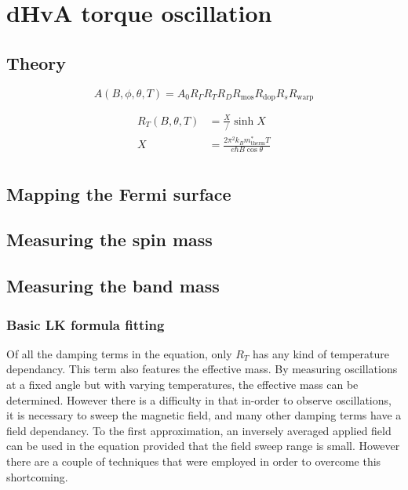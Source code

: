 
\section{dHvA torque oscillation}

\subsection{Theory}

\begin{equation}
A(B,\phi,\theta,T)=A_0R_{\Gamma}R_TR_DR_{\textrm{mos}}R_{\textrm{dop}}R_sR_{\textrm{warp}}
\label{Eqn:2:OscilllationAmp}
\end{equation}

\begin{align}
R_T(B, \theta, T) &= \frac{X}/{\sinh{X}} \\
X                 &= \frac{2\pi^2k_Bm^*_{\textrm{therm}}T}{e\hbar B\cos{\theta}} \\
\label{Eqn:2:TempTermOscillationAmp}
\end{align}

\subsection{Mapping the Fermi surface}

\subsection{Measuring the spin mass}

\subsection{Measuring the band mass}

\subsubsection{Basic LK formula fitting}

Of all the damping terms in the \LK equation, only $R_T$ has any kind of temperature dependancy. This term also features the effective mass. By measuring oscillations at a fixed angle but with varying temperatures, the effective mass can be determined. However there is a difficulty in that in-order to observe oscillations, it is necessary to sweep the magnetic field, and many other damping terms have a field dependancy. To the first approximation, an inversely averaged applied field can be used in the \LK equation provided that the field sweep range is small. However there are a couple of techniques that were employed in order to overcome this shortcoming.

